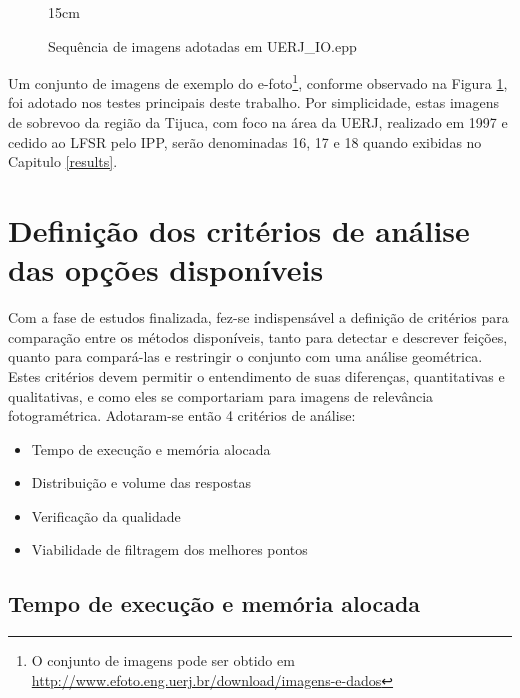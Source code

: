 \begin{figure}[!ht]{15cm}
  \caption{Sequência de imagens adotadas em UERJ\_IO.epp} \label{16_17_18}
  \hfill
  \hfill
\end{figure}

Um conjunto de imagens de exemplo do e-foto\footnote{O conjunto de imagens pode ser obtido em \url{http://www.efoto.eng.uerj.br/download/imagens-e-dados}}, conforme observado na Figura \ref{16_17_18}, foi adotado nos testes principais deste trabalho. Por simplicidade, estas imagens de sobrevoo da região da Tijuca, com foco na área da UERJ, realizado em 1997 e cedido ao LFSR pelo IPP, serão denominadas 16, 17 e 18 quando exibidas no Capitulo \ref{results}.


\section{Definição dos critérios de análise das opções disponíveis}

Com a fase de estudos finalizada, fez-se indispensável a definição de critérios para comparação entre os métodos disponíveis, tanto para detectar e descrever feições, quanto para compará-las e restringir o conjunto com uma análise geométrica. Estes critérios devem permitir o entendimento de suas diferenças, quantitativas e qualitativas, e como eles se comportariam para imagens de relevância fotogramétrica. Adotaram-se então 4 critérios de análise:

\begin{itemize}
    \item Tempo de execução e memória alocada
    \item Distribuição e volume das respostas
    \item Verificação da qualidade
    \item Viabilidade de filtragem dos melhores pontos
\end{itemize}


\subsection{Tempo de execução e memória alocada}

